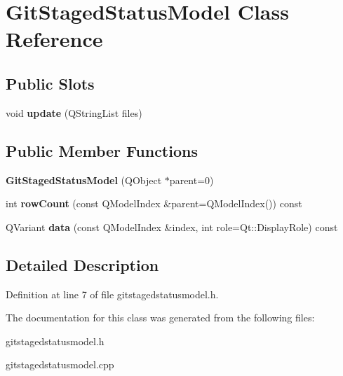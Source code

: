 \hypertarget{class_git_staged_status_model}{
\section{GitStagedStatusModel Class Reference}
\label{class_git_staged_status_model}
}
\subsection*{Public Slots}
\begin{DoxyCompactItemize}
\item 
\hypertarget{class_git_staged_status_model_a24e4cc3ddb82996a8b07c8eaabb9fab1}{
void {\bfseries update} (QStringList files)}
\label{class_git_staged_status_model_a24e4cc3ddb82996a8b07c8eaabb9fab1}

\end{DoxyCompactItemize}
\subsection*{Public Member Functions}
\begin{DoxyCompactItemize}
\item 
\hypertarget{class_git_staged_status_model_acc6d2b8c1d520b3908138055be096d99}{
{\bfseries GitStagedStatusModel} (QObject $\ast$parent=0)}
\label{class_git_staged_status_model_acc6d2b8c1d520b3908138055be096d99}

\item 
\hypertarget{class_git_staged_status_model_a2b1c9c4546f738407e8f6f7b78209df5}{
int {\bfseries rowCount} (const QModelIndex \&parent=QModelIndex()) const }
\label{class_git_staged_status_model_a2b1c9c4546f738407e8f6f7b78209df5}

\item 
\hypertarget{class_git_staged_status_model_a64839406abe19579995b22d9e329a0d8}{
QVariant {\bfseries data} (const QModelIndex \&index, int role=Qt::DisplayRole) const }
\label{class_git_staged_status_model_a64839406abe19579995b22d9e329a0d8}

\end{DoxyCompactItemize}


\subsection{Detailed Description}


Definition at line 7 of file gitstagedstatusmodel.h.



The documentation for this class was generated from the following files:\begin{DoxyCompactItemize}
\item 
gitstagedstatusmodel.h\item 
gitstagedstatusmodel.cpp\end{DoxyCompactItemize}
